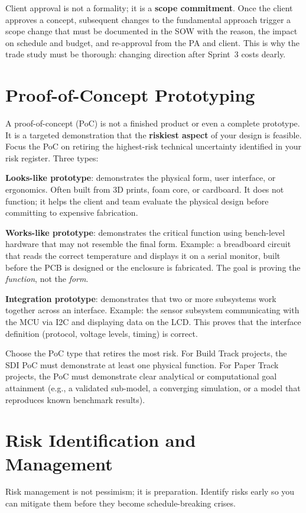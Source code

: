 Client approval is not a formality; it is a \textbf{scope commitment}. Once the client approves a concept, subsequent changes to the fundamental approach trigger a scope change that must be documented in the SOW with the reason, the impact on schedule and budget, and re-approval from the PA and client. This is why the trade study must be thorough: changing direction after Sprint~3 costs dearly.

\section{Proof-of-Concept Prototyping}
A proof-of-concept (PoC) is not a finished product or even a complete prototype. It is a targeted demonstration that the \textbf{riskiest aspect} of your design is feasible. Focus the PoC on retiring the highest-risk technical uncertainty identified in your risk register. Three types:

\textbf{Looks-like prototype}: demonstrates the physical form, user interface, or ergonomics. Often built from 3D prints, foam core, or cardboard. It does not function; it helps the client and team evaluate the physical design before committing to expensive fabrication.

\textbf{Works-like prototype}: demonstrates the critical function using bench-level hardware that may not resemble the final form. Example: a breadboard circuit that reads the correct temperature and displays it on a serial monitor, built before the PCB is designed or the enclosure is fabricated. The goal is proving the \emph{function}, not the \emph{form}.

\textbf{Integration prototype}: demonstrates that two or more subsystems work together across an interface. Example: the sensor subsystem communicating with the MCU via I2C and displaying data on the LCD. This proves that the interface definition (protocol, voltage levels, timing) is correct.

Choose the PoC type that retires the most risk. For Build Track projects, the SDI PoC must demonstrate at least one physical function. For Paper Track projects, the PoC must demonstrate clear analytical or computational goal attainment (e.g., a validated sub-model, a converging simulation, or a model that reproduces known benchmark results).

\section{Risk Identification and Management}
Risk management is not pessimism; it is preparation. Identify risks early so you can mitigate them before they become schedule-breaking crises.

